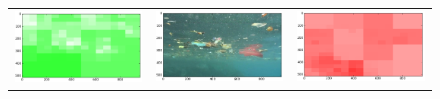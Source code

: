 \begin{figure}[h!tb]
\centering
\ifx\showfig\undefined
\begin{minipage}{1.3\textwidth}
\def\segwidth{.2\textwidth}
\begin{tabular}{ccc}

\includegraphics[keepaspectratio=true,width=\segwidth]{images/segment/6_01__animals__.png} &
\includegraphics[keepaspectratio=true,width=\segwidth]{images/segment/6_01__image__.png} &
\includegraphics[keepaspectratio=true,width=\segwidth]{images/segment/6_01__plastic__.png} \\


\end{tabular}
\end{minipage}
\end{figure}
